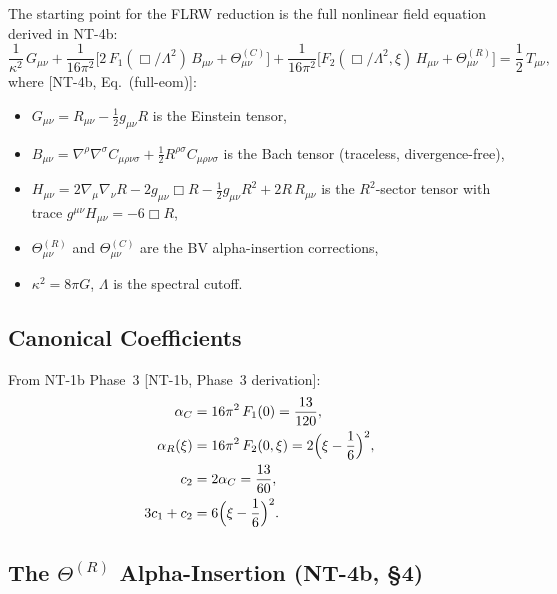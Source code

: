 \documentclass[12pt,a4paper]{article}
\theoremstyle{definition}
\theoremstyle{remark}
\newcommand{\fromlit}[1]{\textcolor{blue!70!black}{\textsf{[#1]}}}
\begin{document}
The starting point for the FLRW reduction is the full nonlinear
field equation derived in NT-4b:
\begin{equation}\label{eq:full-eom}
  \boxed{
  \frac{1}{\kappa^2}\,G_{\mu\nu}
  + \frac{1}{16\pi^2}\bigl[2\,F_1(\Box/\Lambda^2)\,B_{\mu\nu}
    + \Theta^{(C)}_{\mu\nu}\bigr]
  + \frac{1}{16\pi^2}\bigl[F_2(\Box/\Lambda^2,\xi)\,H_{\mu\nu}
    + \Theta^{(R)}_{\mu\nu}\bigr]
  = \frac{1}{2}\,T_{\mu\nu},
  }
\end{equation}
where \fromlit{NT-4b, Eq.~(full-eom)}:
\begin{itemize}[nosep]
  \item $G_{\mu\nu} = R_{\mu\nu} - \tfrac{1}{2}g_{\mu\nu}R$
    is the Einstein tensor,
  \item $B_{\mu\nu} = \nabla^\rho\nabla^\sigma C_{\mu\rho\nu\sigma}
    + \tfrac{1}{2}R^{\rho\sigma}C_{\mu\rho\nu\sigma}$ is the Bach
    tensor (traceless, divergence-free),
  \item $H_{\mu\nu} = 2\nabla_\mu\nabla_\nu R - 2g_{\mu\nu}\Box R
    - \tfrac{1}{2}g_{\mu\nu}R^2 + 2R\,R_{\mu\nu}$ is the $R^2$-sector
    tensor with trace $g^{\mu\nu}H_{\mu\nu} = -6\Box R$,
  \item $\Theta^{(R)}_{\mu\nu}$ and $\Theta^{(C)}_{\mu\nu}$ are the
    BV alpha-insertion corrections,
  \item $\kappa^2 = 8\pi G$, $\Lambda$ is the spectral cutoff.
\end{itemize}

\subsection{Canonical Coefficients}

From NT-1b Phase~3 \fromlit{NT-1b, Phase~3 derivation}:
\begin{align}
  \alpha_C &= 16\pi^2\,F_1(0) = \frac{13}{120},
  \label{eq:alphaC}\\
  \alpha_R(\xi) &= 16\pi^2\,F_2(0,\xi) = 2\Bigl(\xi - \frac{1}{6}\Bigr)^2,
  \label{eq:alphaR}\\
  c_2 &= 2\alpha_C = \frac{13}{60},
  \label{eq:c2}\\
  3c_1 + c_2 &= 6\Bigl(\xi - \frac{1}{6}\Bigr)^2.
  \label{eq:3c1c2}
\end{align}

\subsection{The $\Theta^{(R)}$ Alpha-Insertion (NT-4b, \S4)}
\end{document}
